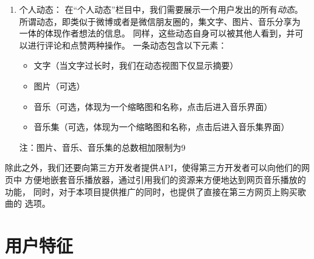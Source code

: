\begin{enumerate}
{\begin{enumerate}
\begin{itemize}
                \item 点赞按钮，以及总共的点赞次数
            \end{itemize}
        \item 个人动态：
            在``个人动态''栏目中，我们需要展示一个用户发出的所有\emph{动态}。
            所谓动态，即类似于微博或者是微信朋友圈的，集文字、图片、音乐分享为
            一体的体现作者想法的信息。
            同样，这些动态自身可以被其他人看到，并可以进行评论和点赞两种操作。 
            一条动态包含以下元素：
            \begin{itemize}
                \item 文字（当文字过长时，我们在动态视图下仅显示摘要）
                \item 图片（可选）
                \item 音乐（可选，体现为一个缩略图和名称，点击后进入音乐界面）
                \item 音乐集（可选，体现为一个缩略图和名称，点击后进入音乐集界面）
            \end{itemize}        
            注：图片、音乐、音乐集的总数相加限制为9
        \end{enumerate}    
    }
\end{enumerate}

除此之外，我们还要向第三方开发者提供API，使得第三方开发者可以向他们的网页中
    方便地嵌套音乐播放器，通过引用我们的资源来方便地达到网页音乐播放的功能，
    同时，对于本项目提供推广的同时，也提供了直接在第三方网页上购买歌曲的
    选项。    

\section{用户特征}


